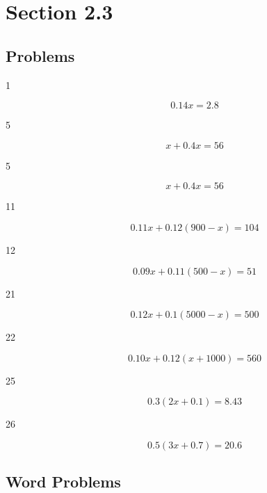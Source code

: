 \documentclass[letterpaper, landscape]{exam}
\begin{document}
  \section{Section 2.3} %

  \subsection{Problems} %
  
  \begin{description}

    \item[1] 
      \[
        0.14x = 2.8
      \]

    \item[5] 
      \[
        x + 0.4x = 56
      \]

    \item[5] 
      \[
        x + 0.4x = 56
      \]

    \item[11] 
      \[
        0.11x + 0.12(900 - x) = 104
      \]

    \item[12] 
      \[
        0.09x + 0.11 (500 - x) = 51
      \]

    \item[21] 
      \[
        0.12x + 0.1(5000 - x) = 500 
      \]

    \item[22] 
      \[
        0.10x + 0.12 (x + 1000) = 560
      \]

    \item[25] 
      \[
        0.3(2x + 0.1) = 8.43
      \]

    \item[26] 
      \[
        0.5(3x + 0.7) = 20.6
      \]

  \end{description}
  
  \subsection{Word Problems} %
\end{document}
